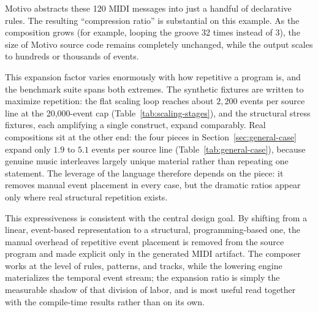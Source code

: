 Motivo abstracts these 120 MIDI messages into just a handful of declarative rules.
The resulting ``compression ratio'' is substantial on this example.
As the composition grows (for example, looping the groove 32 times instead of 3), the size of Motivo source code
remains completely unchanged, while the output scales to hundreds or thousands of events.

This expansion factor varies enormously with how repetitive a program is, and the benchmark suite spans both extremes.
The synthetic fixtures are written to maximize repetition: the flat scaling loop reaches about $2{,}200$ events per
source line at the 20{,}000-event cap (Table~\ref{tab:scaling-stages}), and the structural stress fixtures, each
amplifying a single construct, expand comparably.
Real compositions sit at the other end: the four pieces in Section~\ref{sec:general-case} expand only $1.9$ to $5.1$
events per source line (Table~\ref{tab:general-case}), because genuine music interleaves largely unique material rather
than repeating one statement.
The leverage of the language therefore depends on the piece: it removes manual event placement in every case, but the
dramatic ratios appear only where real structural repetition exists.

This expressiveness is consistent with the central design goal.
By shifting from a linear, event-based representation to a structural, programming-based one, the manual overhead of
repetitive event placement is removed from the source program and made explicit only in the generated MIDI artifact.
The composer works at the level of rules, patterns, and tracks, while the lowering engine materializes the temporal
event stream; the expansion ratio is simply the measurable shadow of that division of labor, and is most useful read
together with the compile-time results rather than on its own.
